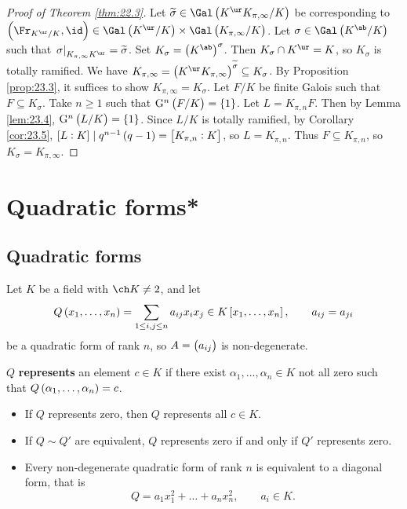 \begin{proof}[Proof of Theorem \ref{thm:22.3}]
Let $ \widetilde{\sigma} \in \Gal\br{K^{\ur}K_{\pi, \infty} / K} $ be corresponding to $ \br{\Fr_{K^{\ur} / K}, \id} \in \Gal\br{K^{\ur} / K} \times \Gal\br{K_{\pi, \infty} / K} $. Let $ \sigma \in \Gal\br{K^{\ab} / K} $ such that $ \eval{\sigma}_{K_{\pi, \infty}K^{\ur}} = \widetilde{\sigma} $. Set $ K_\sigma = \br{K^{\ab}}^\sigma $. Then $ K_\sigma \cap K^{\ur} = K $, so $ K_\sigma $ is totally ramified. We have $ K_{\pi, \infty} = \br{K^{\ur}K_{\pi, \infty}}^{\widetilde{\sigma}} \subseteq K_\sigma $. By Proposition \ref{prop:23.3}, it suffices to show $ K_{\pi, \infty} = K_\sigma $. Let $ F / K $ be finite Galois such that $ F \subseteq K_\sigma $. Take $ n \ge 1 $ such that $ \G^n\br{F / K} = \cbr{1} $. Let $ L = K_{\pi, n}F $. Then by Lemma \ref{lem:23.4}, $ \G^n\br{L / K} = \cbr{1} $. Since $ L / K $ is totally ramified, by Corollary \ref{cor:23.5}, $ \sbr{L : K} \mid q^{n - 1}\br{q - 1} = \sbr{K_{\pi, n} : K} $, so $ L = K_{\pi, n} $. Thus $ F \subseteq K_{\pi, n} $, so $ K_\sigma = K_{\pi, \infty} $.
\end{proof}

\pagebreak

\section{Quadratic forms*}

\subsection{Quadratic forms}

Let $ K $ be a field with $ \ch K \ne 2 $, and let
$$ Q\br{x_1, \dots, x_n} = \sum_{1 \le i, j \le n} a_{ij}x_ix_j \in K\sbr{x_1, \dots, x_n}, \qquad a_{ij} = a_{ji} $$
be a quadratic form of rank $ n $, so $ A = \br{a_{ij}} $ is non-degenerate.

\begin{definition}
$ Q $ \textbf{represents} an element $ c \in K $ if there exist $ \alpha_1, \dots, \alpha_n \in K $ not all zero such that $ Q\br{\alpha_1, \dots, \alpha_n} = c $.
\end{definition}

\begin{fact*}
\hfill
\begin{itemize}
\item If $ Q $ represents zero, then $ Q $ represents all $ c \in K $.
\item If $ Q \sim Q' $ are equivalent, $ Q $ represents zero if and only if $ Q' $ represents zero.
\item Every non-degenerate quadratic form of rank $ n $ is equivalent to a diagonal form, that is
$$ Q = a_1x_1^2 + \dots + a_nx_n^2, \qquad a_i \in K. $$
\end{itemize}
\end{fact*}

